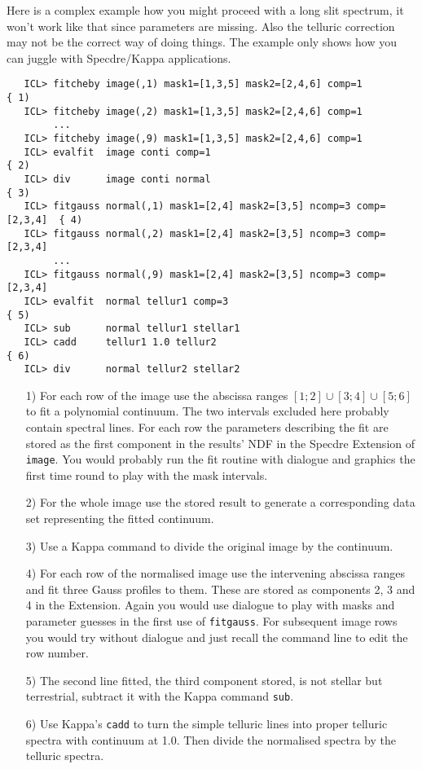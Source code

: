 Here is a complex example how you might proceed with a long slit
spectrum, it won't work like that since parameters are missing. Also the
telluric correction may not be the correct way of doing things. The
example only shows how you can juggle with Specdre/Kappa applications.

\begin{verbatim}
   ICL> fitcheby image(,1) mask1=[1,3,5] mask2=[2,4,6] comp=1             { 1)
   ICL> fitcheby image(,2) mask1=[1,3,5] mask2=[2,4,6] comp=1
        ...
   ICL> fitcheby image(,9) mask1=[1,3,5] mask2=[2,4,6] comp=1
   ICL> evalfit  image conti comp=1                                       { 2)
   ICL> div      image conti normal                                       { 3)
   ICL> fitgauss normal(,1) mask1=[2,4] mask2=[3,5] ncomp=3 comp=[2,3,4]  { 4)
   ICL> fitgauss normal(,2) mask1=[2,4] mask2=[3,5] ncomp=3 comp=[2,3,4]
        ...
   ICL> fitgauss normal(,9) mask1=[2,4] mask2=[3,5] ncomp=3 comp=[2,3,4]
   ICL> evalfit  normal tellur1 comp=3                                    { 5)
   ICL> sub      normal tellur1 stellar1
   ICL> cadd     tellur1 1.0 tellur2                                      { 6)
   ICL> div      normal tellur2 stellar2
\end{verbatim}

\begin{itemize}
\item[1)] For each row of the image use the abscissa ranges
   $[1;2]\cup[3;4]\cup[5;6]$ to fit a polynomial continuum. The two
   intervals excluded here probably contain spectral lines. For each row
   the parameters describing the fit are stored as the first component
   in the results' NDF in the Specdre Extension of {\tt image}. You
   would probably run the fit routine with dialogue and graphics the
   first time round to play with the mask intervals.

\item[2)] For the whole image use the stored result to generate a
   corresponding data set representing the fitted continuum.

\item[3)] Use a Kappa command to divide the original image by the
   continuum.

\item[4)] For each row of the normalised image use the intervening
   abscissa ranges and fit three Gauss profiles to them. These are stored
   as components 2, 3 and 4 in the Extension. Again you would use
   dialogue to play with masks and parameter guesses in the first use of
   {\tt fitgauss}.  For subsequent image rows you would try without
   dialogue and just recall the command line to edit the row number.

\item[5)] The second line fitted, the third component stored, is not
   stellar but terrestrial, subtract it with the Kappa command {\tt sub}.

\item[6)] Use Kappa's {\tt cadd} to turn the simple telluric lines into
   proper telluric spectra with continuum at 1.0. Then divide the
   normalised spectra by the telluric spectra.

\end{itemize}


